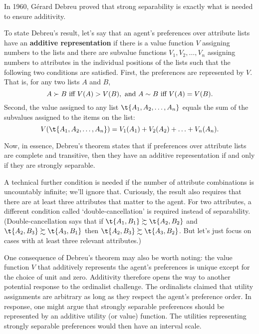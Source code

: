 In 1960, G\'erard Debreu proved that strong separability is exactly what is
needed to ensure additivity.

To state Debreu's result, let's say that an agent's preferences over
attribute lists have an \textbf{additive representation} if there is a
value function $V$ assigning numbers to the lists and there are
subvalue functions $V_1, V_2, \ldots, V_n$ assigning numbers to
attributes in the individual positions of the lists such that the
following two conditions are satisfied. First, the preferences are
represented by $V$. That is, for any two lists $A$ and $B$,
\[
  A \succ B \text{ iff } V(A) > V(B), \text{ and }A \sim B \text{ iff }V(A) = V(B).
\]
Second, the value assigned to any list $\t{A_1,A_2,\ldots,A_n}$ equals
the sum of the subvalues assigned to the items on the list:
\[
V(\t{A_1,A_2,\ldots,A_n}) = V_1(A_1) + V_2(A_2) + \ldots + V_n(A_n).
\]

Now, in essence, Debreu's theorem states that if preferences over
attribute lists are complete and transitive, then they have an
additive representation if and only if they are strongly separable.

A technical further condition is needed if the number of attribute
combinations is uncountably infinite; we'll ignore that. Curiously,
the result also requires that there are at least three attributes that
matter to the agent. For two attributes, a different condition called
`double-cancellation' is required instead of
separability. (Double-cancellation says that if $\t{A_1,B_1} \succsim
\t{A_2,B_2}$ and $\t{A_2,B_3} \succsim \t{A_3,B_1}$ then $\t{A_2,B_3}
\succsim \t{A_3,B_2}$. But let's just focus on cases with at least
three relevant attributes.)

One consequence of Debreu's theorem may also be worth noting: the
value function $V$ that additively represents the agent's preferences
is unique except for the choice of unit and zero. Additivity therefore
opens the way to another potential response to the ordinalist
challenge. The ordinalists claimed that utility assignments are
arbitrary as long as they respect the agent's preference order. In
response, one might argue that strongly separable preferences should
be represented by an additive utility (or value) function. The
utilities representing strongly separable preferences would then have
an interval scale.


